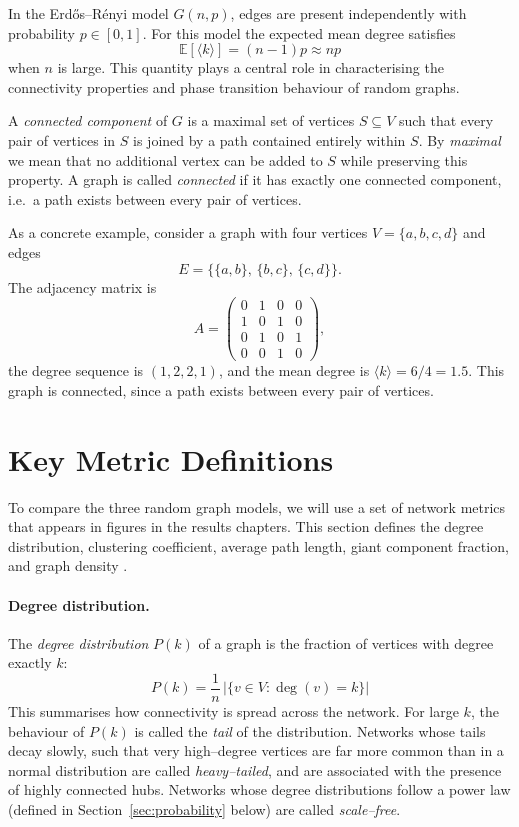 \documentclass[12pt, a4paper]{report}
\theoremstyle{definition}
\theoremstyle{plain}
\theoremstyle{remark}
\begin{document}
In the Erd\H{o}s--R\'enyi model $G(n,p)$, edges are present 
independently with probability $p \in [0,1]$. For this 
model the expected mean degree satisfies
\[
  \mathbb{E}[\langle k \rangle] = (n-1)p \approx np
\]
when $n$ is large. This quantity plays a central role in 
characterising the connectivity properties and phase 
transition behaviour of random graphs.

A \emph{connected component} of $G$ is a maximal set of
vertices $S \subseteq V$ such that every pair of vertices in $S$
is joined by a path contained entirely within $S$. By
\emph{maximal} we mean that no additional vertex can be added to
$S$ while preserving this property. A graph is called
\emph{connected} if it has exactly one connected component,
i.e.\ a path exists between every pair of vertices.

As a concrete example, consider a graph with four vertices 
$V = \{a,b,c,d\}$ and edges
\[
  E = \bigl\{\{a,b\},\, \{b,c\},\, \{c,d\}\bigr\}.
\]
The adjacency matrix is
\[
  A =
  \begin{pmatrix}
    0 & 1 & 0 & 0 \\
    1 & 0 & 1 & 0 \\
    0 & 1 & 0 & 1 \\
    0 & 0 & 1 & 0
  \end{pmatrix},
\]
the degree sequence is $(1,2,2,1)$, and the mean degree 
is $\langle k \rangle = 6/4 = 1.5$. This graph is connected,
since a path exists between every pair of vertices.

\section{Key Metric Definitions}
\label{sec:metrics}

To compare the three random graph models, we will use 
a set of network metrics that appears in figures in
the results chapters. This section defines the degree 
distribution, clustering coefficient, average path length, 
giant component fraction, and graph density
\cite{hofstad2017, albert2002}.

\paragraph{Degree distribution.}
The \emph{degree distribution} $P(k)$ of a graph is the 
fraction of vertices with degree exactly $k$:
\begin{equation}
P(k) = \frac{1}{n}\,\bigl|\{v \in V : \deg(v) = k\}\bigr|
\label{eq:degree-distribution}
\end{equation}
This summarises how connectivity is spread across the network.
For large $k$, the behaviour of $P(k)$ is called the
\emph{tail} of the distribution. Networks whose tails decay
slowly, such that very high--degree vertices are far more common than in a
normal distribution are called \emph{heavy--tailed}, and are associated
with the presence of highly connected hubs.
Networks whose degree distributions follow a power law
(defined in Section~\ref{sec:probability} below) are called
\emph{scale--free}.
\end{document}

